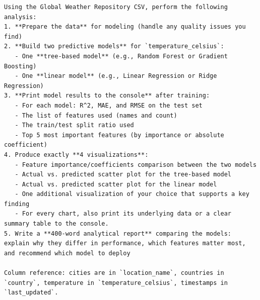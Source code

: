 \begin{lstlisting}[basicstyle=\small\ttfamily, breaklines=true, frame=single, caption={Long task specification (\texttt{config/tasks/long\_task.md})}]
Using the Global Weather Repository CSV, perform the following analysis:
1. **Prepare the data** for modeling (handle any quality issues you find)
2. **Build two predictive models** for `temperature_celsius`:
   - One **tree-based model** (e.g., Random Forest or Gradient Boosting)
   - One **linear model** (e.g., Linear Regression or Ridge Regression)
3. **Print model results to the console** after training:
   - For each model: R^2, MAE, and RMSE on the test set
   - The list of features used (names and count)
   - The train/test split ratio used
   - Top 5 most important features (by importance or absolute coefficient)
4. Produce exactly **4 visualizations**:
   - Feature importance/coefficients comparison between the two models
   - Actual vs. predicted scatter plot for the tree-based model
   - Actual vs. predicted scatter plot for the linear model
   - One additional visualization of your choice that supports a key finding
   - For every chart, also print its underlying data or a clear summary table to the console.
5. Write a **400-word analytical report** comparing the models: explain why they differ in performance, which features matter most, and recommend which model to deploy

Column reference: cities are in `location_name`, countries in `country`, temperature in `temperature_celsius`, timestamps in `last_updated`.
\end{lstlisting}
